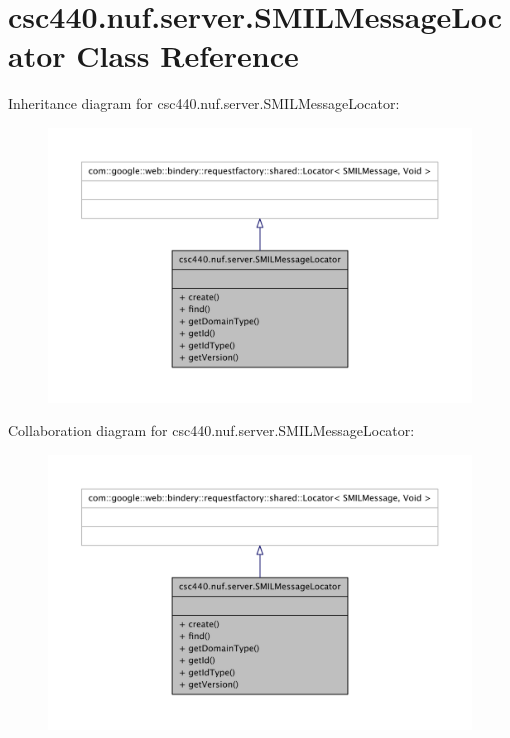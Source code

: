\hypertarget{classcsc440_1_1nuf_1_1server_1_1_s_m_i_l_message_locator}{\section{csc440.\-nuf.\-server.\-S\-M\-I\-L\-Message\-Locator Class Reference}
\label{classcsc440_1_1nuf_1_1server_1_1_s_m_i_l_message_locator}
}


Inheritance diagram for csc440.\-nuf.\-server.\-S\-M\-I\-L\-Message\-Locator\-:
\nopagebreak
\begin{figure}[H]
\begin{center}
\leavevmode
\includegraphics[width=350pt]{classcsc440_1_1nuf_1_1server_1_1_s_m_i_l_message_locator__inherit__graph}
\end{center}
\end{figure}


Collaboration diagram for csc440.\-nuf.\-server.\-S\-M\-I\-L\-Message\-Locator\-:
\nopagebreak
\begin{figure}[H]
\begin{center}
\leavevmode
\includegraphics[width=350pt]{classcsc440_1_1nuf_1_1server_1_1_s_m_i_l_message_locator__coll__graph}
\end{center}
\end{figure}
